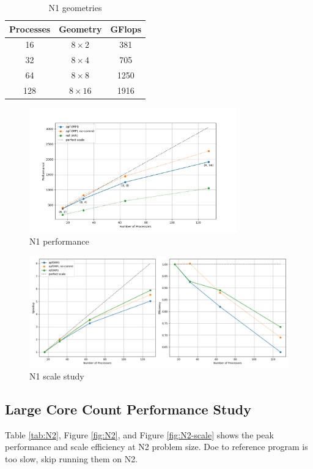 \documentclass[12pt]{article}
\begin{document}
\begin{table}[h!]
\centering
\begin{tabular}{|c|c|c|}
\hline
\textbf{Processes} & \textbf{Geometry} & \textbf{GFlops} \\
\hline
16 & $8 \times 2$ & 381 \\
32 & $8 \times 4$ & 705 \\
64 & $8 \times 8$ & 1250 \\
128 & $8 \times 16$ & 1916 \\
\hline
\end{tabular}
\caption{N1 geometries}
\label{tab:N1}
\end{table}

\begin{figure}[h]
    \centering
    \includegraphics[width=0.8\textwidth]{img/N1.png}
    \caption{N1 performance}
    \label{fig:N1}
\end{figure}

\begin{figure}[h]
    \centering
    \includegraphics[width=\textwidth]{img/N1_scale.png}
    \caption{N1 scale study}
    \label{fig:N1-scale}
\end{figure}

\subsection{Large Core Count Performance Study}
Table \ref{tab:N2}, Figure \ref{fig:N2}, and Figure \ref{fig:N2-scale} 
shows the peak performance and scale efficiency at N2 problem size.
Doe to reference program is too slow, skip running them on N2.
\end{document}

